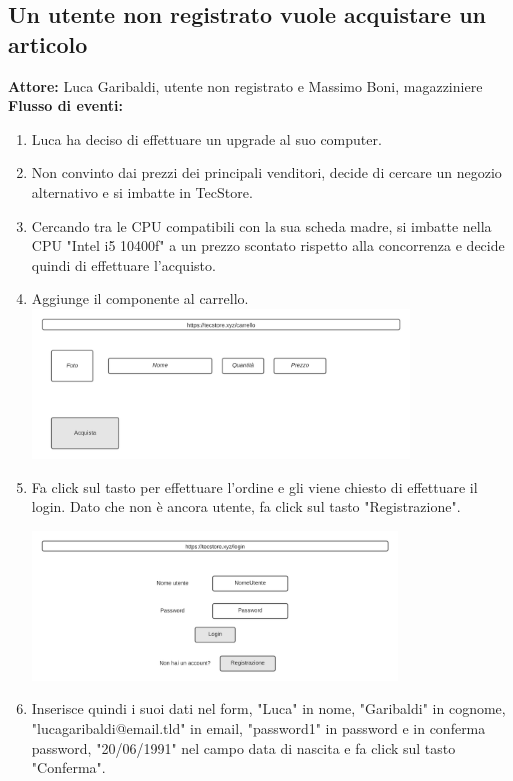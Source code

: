 \documentclass[12pt,a4paper]{article}
\begin{document}
\subsection{Un utente non registrato vuole acquistare un articolo}
\textbf{Attore:} Luca Garibaldi, utente non registrato e Massimo Boni, magazziniere \\
\noindent
\textbf{Flusso di eventi:}
\begin{enumerate}
\item Luca ha deciso di effettuare un upgrade al suo computer.

\item Non convinto dai prezzi dei principali venditori, decide di cercare un negozio alternativo e si imbatte in TecStore.

\item Cercando tra le CPU compatibili con la sua scheda madre, si imbatte nella CPU "Intel i5 10400f" a un prezzo scontato rispetto alla concorrenza e decide quindi di effettuare l'acquisto.

\item Aggiunge il componente al carrello. \\

\includegraphics[height=150px]{carrello}

\item Fa click sul tasto per effettuare l'ordine e gli viene chiesto di effettuare il login. Dato che non è ancora utente, fa click sul tasto "Registrazione".

\includegraphics[height=150px]{login}

\item Inserisce quindi i suoi dati nel form, "Luca" in nome, "Garibaldi" in cognome, "lucagaribaldi@email.tld" in email, "password1" in password e in conferma password, "20/06/1991" nel campo data di nascita e fa click sul tasto "Conferma". \\


\end{enumerate}
\end{document}
